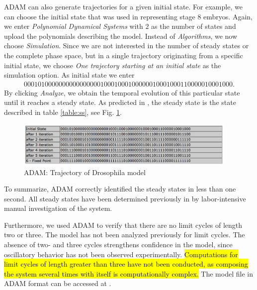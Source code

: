 \documentclass[10pt]{bmc_article}
\newenvironment{bmcformat}{\begin{raggedright}\baselineskip20pt\sloppy\setboolean{publ}{false}}{\end{raggedright}\baselineskip20pt\sloppy}
\newcommand{\comment}[1]{}
\begin{document}
\begin{bmcformat}
ADAM can also generate trajectories for a given initial state. For example, we
can choose the initial state that was used in \cite{AO} representing stage 8 embryos. Again, we
enter {\it Polynomial Dynamical Systems} with $2$ as the number of states and upload the polynomials
describing the model. Instead of {\it Algorithms}, we now choose {\it
Simulation}. Since we are not interested in the number of steady states or the
complete phase space, but in a single trajectory originating from a specific
initial state, we choose {\it One trajectory starting at an initial state} as the simulation option. As
initial state we enter
\begin{align*}
0 0 0 1 0 1 0 0 0 0 0 0 0 0 0
0 0 0 0 0 0 0 1 0 0 0 1 0 0 0
1 0 0 0 0 0 0 1 0 0 0 1 0 0 0
1 1 0 0 0 0 0 1 0 0 0 1 0 0 0.
\end{align*}
By clicking {\it Analyze}, we obtain the temporal evolution of this particular
state until it reaches a steady state. As predicted in \cite{AO}, the
steady state is the state described in table \ref{table:ss}, see Fig.
\ref{fig:traj}.
\begin{figure}[htb]
\centering
\includegraphics[width=0.95\textwidth]{DroTraj.jpg}
\caption{ADAM: Trajectory of Drosophila model}
\label{fig:traj}
\end{figure}

To summarize, ADAM correctly identified the steady states
in less than one second. All steady states have been determined previously in \cite{AO} by labor-intensive manual investigation of the system. \comment{In \cite{AO}, the model is formulated as a set of Boolean rules. In order to determine the steady states, the system of Boolean expressions was solved manually.}

Furthermore, we used ADAM to verify that there are no limit
cycles of length two or three. The model has not been analyzed previously for
limit cycles. The absence of two- and three cycles strengthens confidence in
the model, since oscillatory behavior has not been observed experimentally. \hl{Computations for limit cycles of length greater than three have not been conducted, as composing the system several times with itself is computationally complex.}
The model file in ADAM format can be accessed at \cite{ADAMRepo}.


\end{bmcformat}
\end{document}
